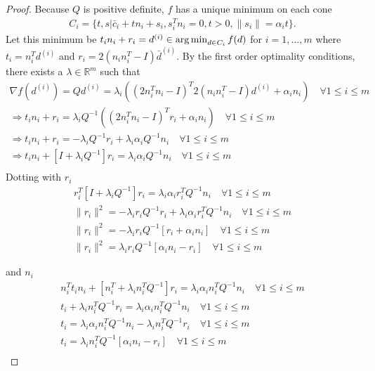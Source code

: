 \begin{proof}
\color{red}
Because $Q$ is positive definite, $f$ has a unique minimum on each cone 
\begin{align*}
C_i = \{ t, s | \bar c_i + tn_i + s_i, s_i^Tn_i = 0, t>0, \|s_i\| = \alpha_i t \}.
\end{align*}
\color{black}
Let this minimum be $t_i n_i + r_i = d^{(i)} \in \operatorname*{arg\,min}_{d \in C_i} f(d)$ for $i=1,\ldots,m$ where $t_i=n_i^Td^{(i)}$ and $r_i = 2 (n_in_i^T - I)\bar d^{(i)}$.
By the first order optimality conditions, there exists a $\lambda \in \mathbb R^m$ such that
\begin{align*}
\nabla f(d^{(i)}) = Q d^{(i)} = \lambda_i \left((2n_i^Tn_i - I)^T2 (n_in_i^T - I)d^{(i)} + \alpha_i n_i \right) \quad \forall 1\le i\le m \\
\Longrightarrow t_in_i + r_i = \lambda_i Q^{-1}\left((2n_i^Tn_i - I)^Tr_i + \alpha_i n_i\right) \quad \forall 1\le i\le m \\
\Longrightarrow t_in_i + r_i = -\lambda_i Q^{-1}r_i + \lambda_i\alpha_i Q^{-1} n_i \quad \forall 1\le i\le m \\
\Longrightarrow t_in_i + \left[I + \lambda_i Q^{-1}\right]r_i = \lambda_i\alpha_i Q^{-1} n_i \quad \forall 1\le i\le m \\
\end{align*}
Dotting with $r_i$
\begin{align*}
r_i^T\left[I + \lambda_i Q^{-1}\right]r_i = \lambda_i\alpha_i r_i^TQ^{-1} n_i \quad \forall 1\le i\le m \\
\|r_i\|^2 = - \lambda_ir_i Q^{-1}r_i + \lambda_i\alpha_i r_i^TQ^{-1} n_i \quad \forall 1\le i\le m \\
\|r_i\|^2 = - \lambda_ir_i Q^{-1}\left[r_i + \alpha_i n_i\right] \quad \forall 1\le i\le m \\
\|r_i\|^2 = \lambda_ir_i Q^{-1}\left[\alpha_i n_i - r_i\right] \quad \forall 1\le i\le m
\end{align*}

and $n_i$
\begin{align*}
n_i^Tt_in_i + \left[n_i^T + \lambda_i n_i^TQ^{-1}\right]r_i = \lambda_i\alpha_i n_i^TQ^{-1} n_i \quad \forall 1\le i\le m \\
t_i + \lambda_i n_i^TQ^{-1}r_i = \lambda_i\alpha_i n_i^TQ^{-1} n_i \quad \forall 1\le i\le m \\
t_i = \lambda_i\alpha_i n_i^TQ^{-1} n_i - \lambda_i n_i^TQ^{-1}r_i \quad \forall 1\le i\le m \\
t_i = \lambda_in_i^TQ^{-1}\left[\alpha_i n_i - r_i\right] \quad \forall 1\le i\le m \\
\end{align*}


\end{proof}
